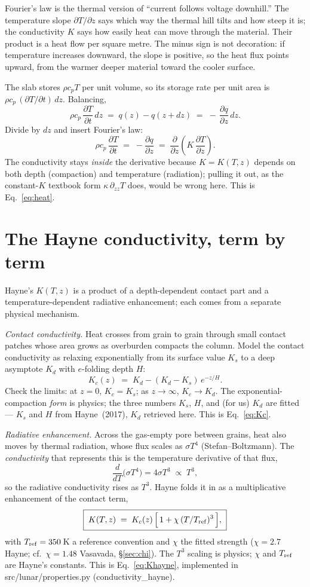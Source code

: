 \documentclass[11pt]{report}
\newcommand{\code}[1]{{\ttfamily\small #1}}
\begin{document}
\begin{plain}
Fourier's law is the thermal version of ``current follows voltage downhill.''
The temperature slope $\partial T/\partial z$ says which way the thermal hill
tilts and how steep it is; the conductivity $K$ says how easily heat can move
through the material. Their product is a heat flow per square metre. The minus
sign is not decoration: if temperature increases downward, the slope is
positive, so the heat flux points upward, from the warmer deeper material toward
the cooler surface.
\end{plain}

The slab stores $\rho c_p T$ per
unit volume, so its storage rate per unit area is $\rho c_p\,(\partial T/\partial
t)\,dz$. Balancing,
\[
\rho c_p\,\frac{\partial T}{\partial t}\,dz
\;=\; q(z) - q(z+dz)
\;=\; -\,\frac{\partial q}{\partial z}\,dz .
\]
Divide by $dz$ and insert Fourier's law:
\[
\boxed{\;\rho c_p\,\frac{\partial T}{\partial t}
\;=\; -\frac{\partial q}{\partial z}
\;=\; \frac{\partial}{\partial z}\!\left(K\,\frac{\partial T}{\partial z}\right).\;}
\]
The conductivity stays \emph{inside} the derivative because $K=K(T,z)$ depends on
both depth (compaction) and temperature (radiation); pulling it out, as the
constant-$K$ textbook form $\kappa\,\partial_{zz}T$ does, would be wrong here.
This is Eq.~\eqref{eq:heat}.

\section{The Hayne conductivity, term by term}\label{app:hayne}
Hayne's $K(T,z)$ is a product of a depth-dependent contact part and a
temperature-dependent radiative enhancement; each comes from a separate physical
mechanism.

\emph{Contact conductivity.} Heat crosses from grain to grain through small
contact patches whose area grows as overburden compacts the column. Model the
contact conductivity as relaxing exponentially from its surface value $K_s$ to a
deep asymptote $K_d$ with $e$-folding depth $H$:
\[
K_c(z) \;=\; K_d - (K_d - K_s)\,e^{-z/H}.
\]
Check the limits: at $z=0$, $K_c=K_s$; as $z\to\infty$, $K_c\to K_d$. The
exponential-compaction \emph{form} is physics; the three numbers $K_s$, $H$, and
(for us) $K_d$ are fitted --- $K_s$ and $H$ from Hayne~(2017), $K_d$ retrieved
here. This is Eq.~\eqref{eq:Kc}.

\emph{Radiative enhancement.} Across the gas-empty pore between grains, heat also
moves by thermal radiation, whose flux scales as $\sigma T^4$
(Stefan--Boltzmann). The \emph{conductivity} that represents this is the
temperature derivative of that flux,
\[
\frac{d}{dT}\big(\sigma T^4\big) = 4\sigma T^3 \;\propto\; T^3,
\]
so the radiative conductivity rises as $T^3$. Hayne folds it in as a
multiplicative enhancement of the contact term,
\[
\boxed{\;K(T,z) \;=\; K_c(z)\,\Big[\,1 + \chi\,(T/T_{\rm ref})^3\,\Big],\;}
\]
with $T_{\rm ref}=350$\,K a reference convention and $\chi$ the fitted strength
($\chi=2.7$ Hayne; cf.\ $\chi=1.48$ Vasavada, \S\ref{sec:chi}). The $T^3$ scaling
is physics; $\chi$ and $T_{\rm ref}$ are Hayne's constants. This is
Eq.~\eqref{eq:Khayne}, implemented in \code{src/lunar/properties.py}
(\code{conductivity\_hayne}).
\end{document}
